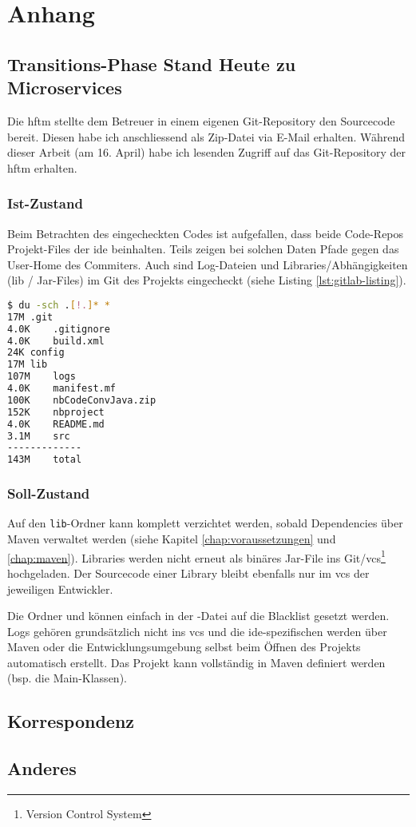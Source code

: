 \chapter{Anhang}
\section{Transitions-Phase Stand Heute zu Microservices}
\label{chap:tranition-git}
Die \acrshort{hftm} stellte dem Betreuer in einem eigenen Git-Repository den Sourcecode bereit. Diesen habe ich anschliessend als Zip-Datei via E-Mail erhalten. Während dieser Arbeit (am 16. April) habe ich lesenden Zugriff auf das Git-Repository der \acrshort{hftm} erhalten\cite{gitlab.com/solidus/hefei}. 

\subsection{Ist-Zustand}
Beim Betrachten des eingecheckten Codes ist aufgefallen, dass beide Code-Repos Projekt-Files der \acrshort{ide} beinhalten. Teils zeigen bei solchen Daten Pfade gegen das User-Home des Commiters. Auch sind Log-Dateien und Libraries/Abhängigkeiten (lib / Jar-Files) im Git des Projekts eingecheckt (siehe Listing \ref{lst:gitlab-listing}). 
\begin{lstlisting}[caption={Listing der Daten im Git-Repository 'gitlab.com/solidus/hefei'},language=Bash, columns=fixed,label={lst:gitlab-listing}]
$ du -sch .[!.]* *
17M	.git
4.0K	.gitignore
4.0K	build.xml
24K	config
17M	lib
107M	logs
4.0K	manifest.mf
100K	nbCodeConvJava.zip
152K	nbproject
4.0K	README.md
3.1M	src
-------------
143M	total
\end{lstlisting}
\subsection{Soll-Zustand}
Auf den \verb|lib|-Ordner kann komplett verzichtet werden, sobald Dependencies über Maven verwaltet werden (siehe Kapitel \ref{chap:voraussetzungen} und \ref{chap:maven}). Libraries werden nicht erneut als binäres Jar-File ins Git/\acrshort{vcs}\footnote{Version Control System} hochgeladen. Der Sourcecode einer Library bleibt ebenfalls nur im \acrshort{vcs} der jeweiligen Entwickler.

Die Ordner  und  können einfach in der -Datei auf die Blacklist gesetzt werden. Logs gehören grundsätzlich nicht ins \acrshort{vcs} und die \acrshort{ide}-spezifischen werden über Maven oder die Entwicklungsumgebung selbst beim Öffnen des Projekts automatisch erstellt. Das Projekt kann vollständig in Maven definiert werden (bsp. die Main-Klassen).

\section{Korrespondenz}
\section{Anderes}

